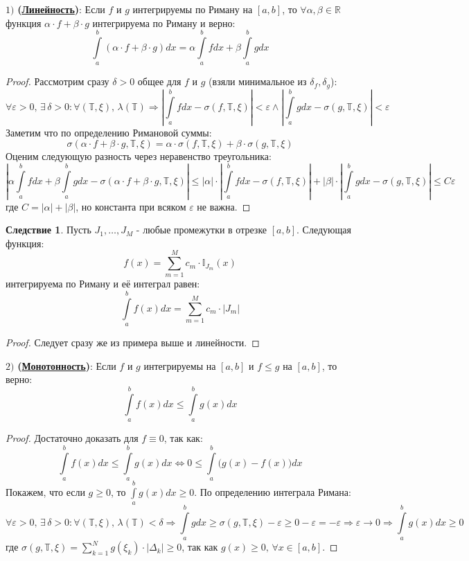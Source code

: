 \documentclass[12pt]{article}
\newcommand{\MR}{\mathbb{R}}
\newcommand{\MTB}{\mathbb{T}}
\newcommand{\VE}{\varepsilon}
\theoremstyle{definition}
\newtheorem{corollary}{Следствие}
\newcommand{\ddint}[2]{\displaystyle\int\limits_{#1}^{#2}}
\begin{document}
$1)$ \textbf{(\uline{Линейность})}: Если $f$ и $g$ интегрируемы по Риману на $[a,b]$, то $\forall \alpha, \beta \in \MR$ функция $\alpha{\cdot}f + \beta{\cdot}g$ интегрируема по Риману и верно:
$$
	\ddint{a}{b}(\alpha {\cdot} f + \beta {\cdot} g) dx = \alpha \ddint{a}{b}fdx + \beta\ddint{a}{b}gdx
$$
\begin{proof}
	Рассмотрим сразу $\delta > 0$ общее для $f$ и $g$ (взяли минимальное из $\delta_f, \delta_g$):
	$$
		\forall \VE > 0, \, \exists \, \delta > 0 \colon \forall (\MTB, \xi),\, \lambda(\MTB) \Rightarrow \left|\ddint{a}{b}fdx - \sigma(f, \MTB,\xi)\right| < \VE \wedge \left|\ddint{a}{b}gdx - \sigma(g, \MTB,\xi)\right| < \VE
	$$
	Заметим что по определению Римановой суммы: 
	$$
		\sigma(\alpha {\cdot} f + \beta {\cdot} g, \MTB, \xi) = \alpha{\cdot} \sigma(f, \MTB,\xi) + \beta{\cdot}\sigma(g, \MTB,\xi)
	$$ 
	Оценим следующую разность через неравенство треугольника:
	$$
		\left|\alpha\ddint{a}{b}fdx + \beta\ddint{a}{b}gdx - \sigma(\alpha {\cdot} f + \beta {\cdot} g, \MTB, \xi)\right| \leq |\alpha|{\cdot}\left| \ddint{a}{b}fdx - \sigma(f, \MTB,\xi)\right| + |\beta|{\cdot}\left|\ddint{a}{b}gdx - \sigma(g, \MTB,\xi)\right| \leq C \VE
	$$
	где $C = |\alpha| + |\beta|$, но константа при всяком $\VE$ не важна.
\end{proof}
\begin{corollary}
	Пусть $J_1,\dotsc, J_M$ - любые промежутки в отрезке $[a,b]$. Следующая функция:
	$$
		f(x) = \displaystyle \sum\limits_{m=1}^Mc_m{\cdot}\mathbb{I}_{J_m}(x)
	$$ 
	интегрируема по Риману и её интеграл равен:
	$$
		\ddint{a}{b}f(x)dx = \displaystyle \sum\limits_{m=1}^Mc_m{\cdot}|J_m|
	$$
\end{corollary}
\begin{proof}
	Следует сразу же из примера выше и линейности.
\end{proof}
$2)$ \textbf{(\uline{Монотонность})}: Если $f$ и $g$ интегрируемы на $[a,b]$ и $f \leq g$ на $[a,b]$, то верно:
$$
	\ddint{a}{b}f(x)dx \leq \ddint{a}{b}g(x)dx
$$
\begin{proof}
	Достаточно доказать для $f \equiv 0$, так как:
	$$
		\ddint{a}{b}f(x)dx \leq \ddint{a}{b}g(x)dx \Leftrightarrow 0 \leq \ddint{a}{b}\big(g(x) - f(x)\big)dx 
	$$
	Покажем, что если $g \geq 0$, то $\ddint{a}{b}g(x)dx \geq 0$. По определению интеграла Римана:
	$$
		\forall \VE > 0, \, \exists \, \delta > 0 \colon \forall (\MTB, \xi), \, \lambda(\MTB) < \delta \Rightarrow \ddint{a}{b}gdx \geq \sigma(g,\MTB,\xi) - \VE \geq 0 - \VE = - \VE \Rightarrow \VE \to 0 \Rightarrow \ddint{a}{b}g(x)dx \geq 0
	$$
	где $\sigma(g,\MTB,\xi) = \displaystyle \sum\limits_{k = 1}^{N}g(\xi_k){\cdot}|\Delta_k| \geq 0$, так как $g(x) \geq 0, \, \forall x \in [a,b]$.
\end{proof}
\end{document}
